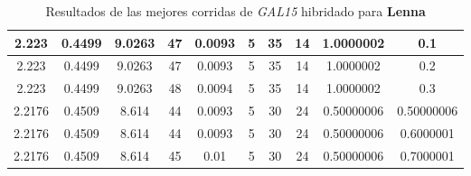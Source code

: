 \begin{table}[h!]
\begin{center}
\begin{tabular}{|c|c|c|c|c|c|c|c|c|c|}
        \hline
        \hline
            2.223 & 0.4499  & 9.0263 & 47 & 0.0093 & 5 & 35 & 14 & 1.0000002 & 0.1\\
        \hline
        \hline
            2.223 & 0.4499  & 9.0263 & 47 & 0.0093 & 5 & 35 & 14 & 1.0000002 & 0.2\\
        \hline
        \hline
            2.223 & 0.4499  & 9.0263 & 48 & 0.0094 & 5 & 35 & 14 & 1.0000002 & 0.3\\
        \hline
        \hline
            2.2176 & 0.4509  & 8.614 & 44 & 0.0093 & 5 & 30 & 24 & 0.50000006 & 0.50000006\\
        \hline
        \hline
            2.2176 & 0.4509  & 8.614 & 44 & 0.0093 & 5 & 30 & 24 & 0.50000006 & 0.6000001\\
        \hline
        \hline
            2.2176 & 0.4509  & 8.614 & 45 & 0.01 & 5 & 30 & 24 & 0.50000006 & 0.7000001\\
        \hline
        \end{tabular}
        \caption{Resultados de las mejores corridas de \emph{GAL15} hibridado para {\bf Lenna}}
        \label{tb:tableGAL15}
    \end{center}
\end{table}
